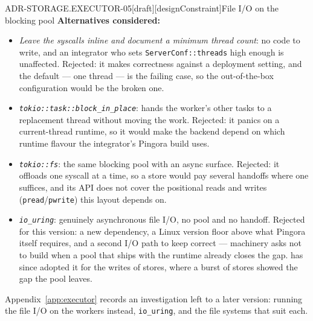 \begin{requirement}{ADR-STORAGE.EXECUTOR-05}[draft][designConstraint]{File I/O on the blocking pool}
  \textbf{Alternatives considered:}
  \begin{itemize}
    \item \emph{Leave the syscalls inline and document a minimum thread
      count}: no code to write, and an integrator who sets
      \texttt{ServerConf::threads} high enough is unaffected. Rejected: it
      makes correctness against  a deployment
      setting, and the default --- one thread --- is the failing case, so the
      out-of-the-box configuration would be the broken one.
    \item \emph{\texttt{tokio::task::block\_in\_place}}: hands the worker's
      other tasks to a replacement thread without moving the work. Rejected:
      it panics on a current-thread runtime, so it would make the backend
      depend on which runtime flavour the integrator's Pingora build uses.
    \item \emph{\texttt{tokio::fs}}: the same blocking pool with an async
      surface. Rejected: it offloads one syscall at a time, so a store would
      pay several handoffs where one suffices, and its API does not cover the
      positional reads and writes (\texttt{pread}/\texttt{pwrite}) this
      layout depends on.
    \item \emph{\texttt{io\_uring}}: genuinely asynchronous file I/O, no pool
      and no handoff. Rejected for this version: a new dependency, a Linux
      version floor above what Pingora itself requires, and a second I/O path
      to keep correct --- machinery  asks not to build
      when a pool that ships with the runtime already closes the gap.
       has since adopted it for the writes
      of stores, where a burst of stores showed the gap the pool leaves.
  \end{itemize}
  Appendix~\ref{app:executor} records an investigation left to a later
  version: running the file I/O on the workers instead, \texttt{io\_uring},
  and the file systems that suit each.


\end{requirement}
